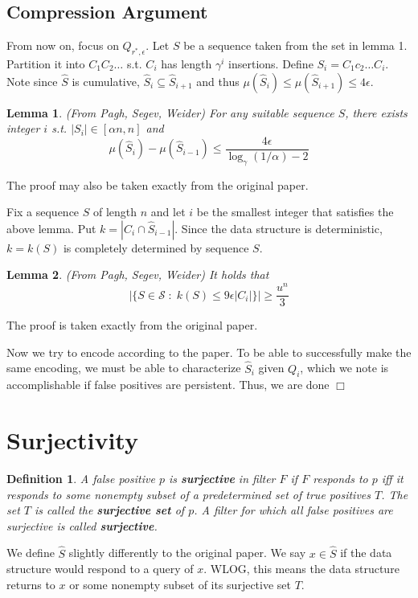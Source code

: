 \documentclass{article}
\newtheorem{definition}{Definition}[section]
\newtheorem{lemma}{Lemma}[section]
\begin{document}
\subsection{Compression Argument}
From now on, focus on $Q_{r^*,\epsilon}$. Let $S$ be a sequence taken from the set in lemma 1. Partition it into $C_1C_2\dots$ s.t. $C_i$ has length $\gamma^i$ insertions. Define $S_i = C_1c_2\dots C_i$. Note since $\hat{S}$ is cumulative, $\hat{S}_i \subseteq \hat{S}_{i+1}$ and thus $\mu(\hat{S}_i) \leqslant \mu(\hat{S}_{i+1}) \leqslant 4\epsilon$.

\begin{lemma}
(From Pagh, Segev, Weider) For any suitable sequence $S$, there exists integer $i$ s.t. $|S_i| \in [\alpha n,n]$ and
$$\mu(\hat{S}_i) - \mu(\hat{S}_{i-1}) \leqslant \frac{4\epsilon}{\log_\gamma(1/\alpha)-2}$$
\end{lemma}
The proof may also be taken exactly from the original paper.

Fix a sequence $S$ of length $n$ and let $i$ be the smallest integer that satisfies the above lemma. Put $k = |C_i \cap \hat{S}_{i-1}|$. Since the data structure is deterministic, $k = k(S)$ is completely determined by sequence $S$.
\begin{lemma}
(From Pagh, Segev, Weider) It holds that
\begin{equation}
|\{S \in \mathcal{S} \;:\; k(S) \leqslant 9\epsilon|C_i|\}| \geqslant \frac{u^n}{3}
\end{equation}
\end{lemma}
The proof is taken exactly from the original paper.

Now we try to encode according to the paper. To be able to successfully make the same encoding, we must be able to characterize $\hat{S}_i$ given $Q_i$, which we note is accomplishable if false positives are persistent. Thus, we are done $\Box$

\section{Surjectivity}
\begin{definition}
A false positive $p$ is \textbf{surjective} in filter $F$ if $F$ responds  to $p$ iff it responds  to some nonempty subset of a predetermined set of true positives $T$. The set $T$ is called the \textbf{surjective set} of $p$. A filter for which all false positives are surjective is called \textbf{surjective}.
\end{definition}
We define $\hat{S}$ slightly differently to the original paper. We say $x \in \hat{S}$ if the data structure would respond  to a query of $x$. WLOG, this means the data structure returns  to $x$ or some nonempty subset of its surjective set $T$.
\end{document}
